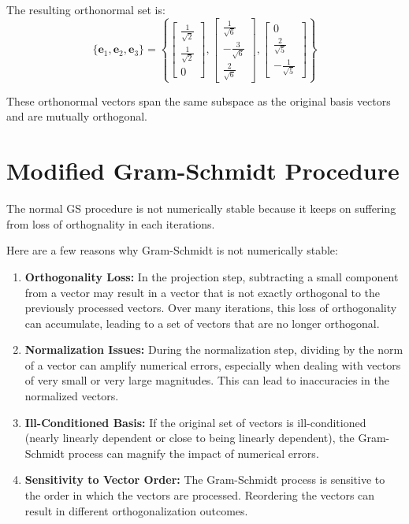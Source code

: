 The resulting orthonormal set is:
\[ \{\mathbf{e}_1, \mathbf{e}_2, \mathbf{e}_3\} = \left\{
\begin{bmatrix}
\frac{1}{\sqrt{2}} \\[1ex]
\frac{1}{\sqrt{2}} \\[1ex]
0
\end{bmatrix},
\begin{bmatrix}
\frac{1}{\sqrt{6}} \\[1ex]
-\frac{3}{\sqrt{6}} \\[1ex]
\frac{2}{\sqrt{6}}
\end{bmatrix},
\begin{bmatrix}
0 \\[1ex]
\frac{2}{\sqrt{5}} \\[1ex]
-\frac{1}{\sqrt{5}}
\end{bmatrix}
\right\}
\]

These orthonormal vectors span the same subspace as the original basis vectors and are mutually orthogonal.

\section{Modified Gram-Schmidt Procedure}

The normal GS procedure is not numerically stable because it keeps on suffering from loss of orthognality in each iterations. 

Here are a few reasons why Gram-Schmidt is not numerically stable:

\begin{enumerate}[label=\arabic*.]
    \item \textbf{Orthogonality Loss:} In the projection step, subtracting a small component from a vector may result in a vector that is not exactly orthogonal to the previously processed vectors. Over many iterations, this loss of orthogonality can accumulate, leading to a set of vectors that are no longer orthogonal.
    
    \item \textbf{Normalization Issues:} During the normalization step, dividing by the norm of a vector can amplify numerical errors, especially when dealing with vectors of very small or very large magnitudes. This can lead to inaccuracies in the normalized vectors.
    
    \item \textbf{Ill-Conditioned Basis:} If the original set of vectors is ill-conditioned (nearly linearly dependent or close to being linearly dependent), the Gram-Schmidt process can magnify the impact of numerical errors.
    
    \item \textbf{Sensitivity to Vector Order:} The Gram-Schmidt process is sensitive to the order in which the vectors are processed. Reordering the vectors can result in different orthogonalization outcomes.
\end{enumerate}



